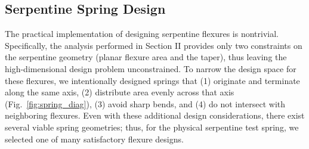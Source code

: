 \documentclass[letterpaper, 10 pt, conference]{ieeeconf} %
\begin{document}
\subsection{Serpentine Spring Design}
The practical implementation of designing serpentine flexures is nontrivial. Specifically, the analysis performed in Section II provides only two constraints on the serpentine geometry (planar flexure area and the taper), thus leaving the high-dimensional design problem unconstrained. To narrow the design space for these flexures, we intentionally designed springs that (1) originate and terminate along the same axis, (2) distribute area evenly across that axis (Fig.~\ref{fig:spring_diag}), (3) avoid sharp bends, and (4) do not intersect with neighboring flexures. Even with these additional design considerations, there exist several viable spring geometries; thus, for the physical serpentine test spring, we selected one of many satisfactory flexure designs.
\end{document}
